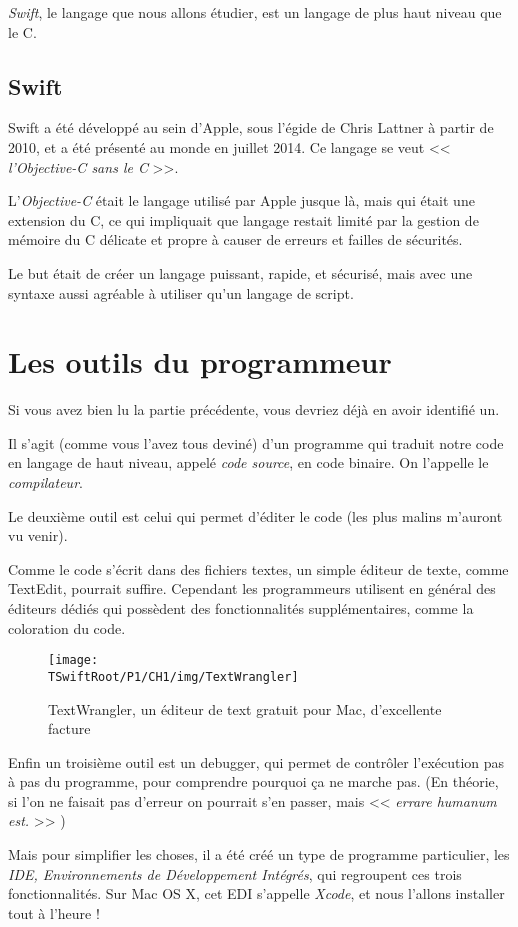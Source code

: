\emph{Swift}, le langage que nous allons étudier, est un langage de plus haut niveau
que le C.
\subsection{Swift}
Swift a été développé au sein d'Apple, sous l'égide de Chris Lattner à partir de 2010, et a
été présenté au monde en juillet 2014. Ce langage se veut << \emph{l'Objective-C sans le C} >>.

L'\emph{Objective-C} était le langage utilisé par Apple jusque là, mais qui était une extension du
C, ce qui impliquait que langage restait limité par la gestion de mémoire du C délicate et propre à causer de erreurs et failles de sécurités.

Le but était de créer un langage puissant, rapide, et sécurisé, mais avec une syntaxe
aussi agréable à utiliser qu’un langage de script.
\section{Les outils du programmeur}
Si vous avez bien lu la partie précédente, vous devriez déjà en avoir identifié un.

Il s'agit (comme vous l'avez tous deviné) d'un programme qui traduit notre code en
langage de haut niveau, appelé \emph{code source}, en code binaire. On l'appelle le
\emph{compilateur}.

%

Le deuxième outil est celui qui permet d'éditer le code (les plus malins m'auront vu venir).

Comme le code s'écrit dans des fichiers textes, un simple éditeur de texte, comme
TextEdit, pourrait suffire. Cependant les programmeurs utilisent en général des éditeurs
dédiés qui possèdent des fonctionnalités supplémentaires, comme la coloration du code.
\begin{figure}[H]
\texttt{[image: \\TSwiftRoot/P1/CH1/img/TextWrangler]}
\caption{TextWrangler, un éditeur de text gratuit pour Mac, d'excellente facture}
\end{figure}
Enfin un troisième outil est un debugger, qui permet de contrôler l'exécution pas à pas du
programme, pour comprendre pourquoi ça ne marche pas. (En théorie, si l'on ne faisait
pas d'erreur on pourrait s'en passer, mais << \emph{errare humanum est.} >> )

Mais pour simplifier les choses, il a été créé un type de programme particulier, les \emph{IDE,
Environnements de Développement Intégrés}, qui regroupent ces trois fonctionnalités. Sur
Mac OS X, cet EDI s'appelle \emph{Xcode}, et nous l'allons installer tout à l'heure !
